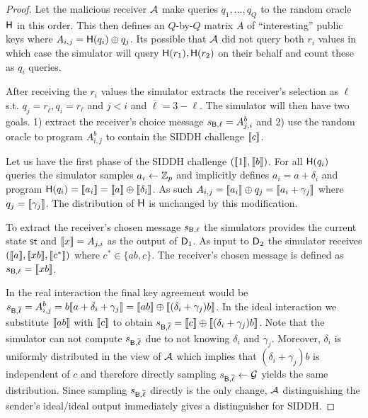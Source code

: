 \begin{proof}
	
	Let the malicious receiver $\mathcal{A}$ make queries $q_1,...,q_Q$ to the random oracle $\mathsf{H}$ in this order. This then defines an $Q$-by-$Q$ matrix $A$ of ``interesting'' public keys where $A_{i,j}=\mathsf{H}(q_i)\oplus q_j$. Its possible that $\mathcal{A}$ did not query both $r_i$ values in which case the simulator will query $\mathsf{H}(r_1),\mathsf{H}(r_2)$ on their behalf and count these as $q_i$ queries.
	
	After receiving the $r_i$ values the simulator extracts the receiver's selection as $\ell$ s.t. $ q_j=r_{{\overline \ell}}, q_i=r_{\ell}$ and $j<i$ and $\overline \ell =3-\ell$. The simulator will then have two goals. 1) extract the receiver's choice message $s_{\mathsf{B}, \ell}=A_{j,i}^b$ and 2) use the random oracle to program $A_{i,j}^b$ to contain the SIDDH challenge $\llbracket c\rrbracket$.
	
	
	Let us have the first phase of the SIDDH challenge $(\llbracket 1\rrbracket, \llbracket b\rrbracket)$. For all $\mathsf{H}(q_i)$ queries the simulator samples $a_i\gets \mathbb Z_p$ and implicitly defines $a_i=a+\delta_i$ and program $\mathsf{H}(q_i)=\llbracket a_i\rrbracket =\llbracket a\rrbracket \oplus \llbracket{\delta_i}\rrbracket$. As such $A_{i,j}=\llbracket{a_i}\rrbracket \oplus q_j =\llbracket a_i+\gamma_j\rrbracket$ where $q_j =\llbracket\gamma_j\rrbracket$. The distribution of $\mathsf{H}$ is unchanged by this modification.
	
	To extract the receiver's chosen message $s_{\mathsf{B}, \ell}$ the simulators provides the current state $\textsf{st}$ and $\llbracket x\rrbracket=A_{j,i}$ as the output of $\mathsf D_1$. As input to $\mathsf D_2$ the simulator receives $(\llbracket a\rrbracket, \llbracket xb\rrbracket,\llbracket c^*\rrbracket)$ where $c^*\in\{ab,c\}$. The receiver's chosen message is defined as $s_{\mathsf{B}, \ell}=\llbracket xb\rrbracket$. 
	
	In the real interaction the final key agreement would be $s_{\mathsf{B},{\overline \ell}}=A^b_{i,j}=b\llbracket a+\delta_i+\gamma_j\rrbracket= \llbracket ab\rrbracket \oplus \llbracket{(\delta_i+\gamma_j)b}\rrbracket$. In the ideal interaction we substitute $\llbracket ab\rrbracket$ with $\llbracket c\rrbracket$ to obtain $s_{\mathsf{B},{\overline \ell}}= \llbracket c\rrbracket \oplus \llbracket{(\delta_i+\gamma_j)b}\rrbracket$. Note that the simulator can not compute $s_{\mathsf{B},{\overline \ell}}$ due to not knowing $\delta_i$ and $\gamma_j$. Moreover, $\delta_i$ is uniformly distributed in the view of $\mathcal{A}$ which implies that $(\delta_i+\gamma_j)b$ is independent of $c$ and therefore directly sampling  $s_{\mathsf{B},{\overline \ell}}\gets \mathcal{G}$ yields the same distribution. Since sampling $s_{\mathsf{B},{\overline \ell}}$ directly is the only change,  $\mathcal{A}$ distinguishing the sender's ideal/ideal output immediately gives a distinguisher for SIDDH.		
\end{proof}


